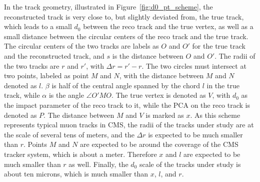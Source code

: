 In the track geometry, illustrated in Figure~\ref{fig:d0_pt_scheme}, 
the reconstructed track is very close to, but slightly deviated from, the true track,
which leads to a small $d_0$ between the reco track and the true vertex, 
as well as a small distance between the circular centers of the reco track and the true track.
The circular centers of the two tracks are labels as $O$ and $O'$ for the true track and the reconstructed track,
and $s$ is the distance between $O$ and $O'$. 
The radii of the two tracks are $r$ and $r'$, with $\Delta{}r = r' - r$.
The two circles must intersect at two points, labeled as point $M$ and $N$, 
with the distance between $M$ and $N$ denoted as $l$.
$\beta$ is half of the central angle spanned by the chord $l$ in the true track,
while $\alpha$ is the angle $\angle O'MO$.
The true vertex is denoted as $V$, with $d_0$ as the impact parameter of the reco track to it,
while the PCA on the reco track is denoted as $P$.
The distance between $M$ and $V$ is marked as $x$.
As this scheme represents typical muon tracks in CMS, 
the radii of the tracks under study are at the scale of several tens of meters,
and the $\Delta{}r$ is expected to be much smaller than $r$.
Points $M$ and $N$ are expected to be around the coverage of the CMS tracker system, which is about a meter.
Therefore $x$ and $l$ are expected to be much smaller than $r$ as well.
Finally, the $d_0$ scale of the tracks under study is about ten microns, which is much smaller than $x$, $l$, and $r$. 

